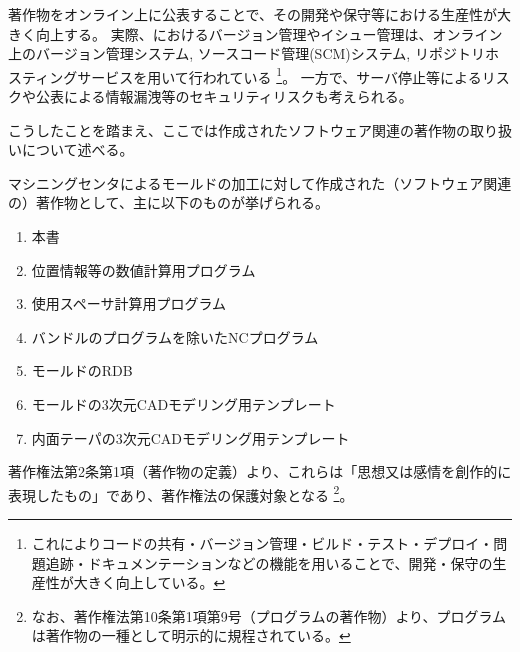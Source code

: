 

著作物をオンライン上に公表することで、その開発や保守等における生産性が大きく向上する。
実際、\DMname におけるバージョン管理やイシュー管理は、オンライン上のバージョン管理システム, ソースコード管理(SCM)システム, リポジトリホスティングサービスを用いて行われている
\footnote{これによりコードの共有・バージョン管理・ビルド・テスト・デプロイ・問題追跡・ドキュメンテーションなどの機能を用いることで、開発・保守の生産性が大きく向上している。}。
一方で、サーバ停止等によるリスクや公表による情報漏洩等のセキュリティリスクも考えられる。

こうしたことを踏まえ、ここでは作成されたソフトウェア関連の著作物の取り扱いについて述べる。



マシニングセンタによるモールドの加工に対して作成された（ソフトウェア関連の）著作物として、主に以下のものが挙げられる。
\begin{enumerate}
\item 本書
\item 位置情報等の数値計算用プログラム
\item 使用スペーサ計算用プログラム
\item バンドルのプログラムを除いたNCプログラム
\item モールドのRDB
\item モールドの3次元CADモデリング用テンプレート
\item 内面テーパの3次元CADモデリング用テンプレート
\end{enumerate}
著作権法第2条第1項（著作物の定義）より、これらは「思想又は感情を創作的に表現したもの」であり、著作権法の保護対象となる
\footnote{なお、著作権法第10条第1項第9号（プログラムの著作物）より、プログラムは著作物の一種として明示的に規程されている。}。





